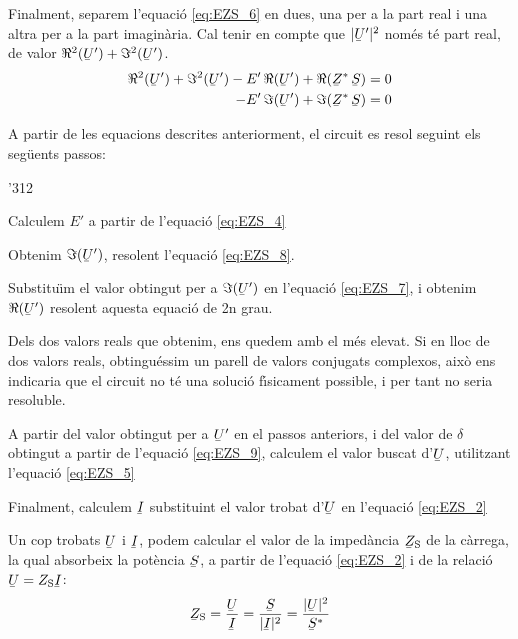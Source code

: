 Finalment, separem l'equaci\'{o} \eqref{eq:EZS_6} en dues, una per a la part real i una altra per a la part imagin\`{a}ria. Cal tenir en compte que $|\cmplx{U}'|^2$ nom\'{e}s t\'{e} part real, de valor $\Re^2(\cmplx{U}') + \Im^2(\cmplx{U}')$.
\begin{align}
   \Re^2(\cmplx{U}') + \Im^2(\cmplx{U}') - E' \, \Re(\cmplx{U}') + \Re(\cmplx{Z}^* \, \cmplx{S}) &= 0 \label{eq:EZS_7} \\
   - E' \, \Im(\cmplx{U}') + \Im(\cmplx{Z}^* \, \cmplx{S}) &= 0 \label{eq:EZS_8}
\end{align}

A partir de les equacions descrites anteriorment, el circuit es resol seguint els seg\"{u}ents passos:
\begin{dingautolist}{'312}
   \item Calculem $E'$ a partir de l'equaci\'{o} \eqref{eq:EZS_4}
   \item Obtenim $\Im(\cmplx{U}')$, resolent l'equaci\'{o} \eqref{eq:EZS_8}.
   \item Substitu\"{\i}m el valor obtingut per a $\Im(\cmplx{U}')$ en l'equaci\'{o} \eqref{eq:EZS_7}, i obtenim $\Re(\cmplx{U}')$ resolent aquesta equaci\'{o} de 2n grau.
   \item Dels dos valors reals que obtenim, ens quedem amb el m\'{e}s elevat. Si en lloc de dos valors reals, obtingu\'{e}ssim un parell de valors conjugats complexos, aix\`{o} ens indicaria que el circuit no t\'{e} una soluci\'{o} f\'{\i}sicament possible, i per tant no seria resoluble.
   \item A partir del valor  obtingut per a $\cmplx{U}'$ en el passos anteriors, i del valor de $\delta$ obtingut a partir de l'equaci\'{o} \eqref{eq:EZS_9}, calculem el valor buscat d'$\cmplx{U}$, utilitzant l'equaci\'{o} \eqref{eq:EZS_5}
   \item Finalment, calculem $\cmplx{I}$ substituint el valor trobat d'$\cmplx{U}$ en l'equaci\'{o} \eqref{eq:EZS_2}
\end{dingautolist}

Un cop trobats $\cmplx{U}$ i $\cmplx{I}$, podem calcular el valor de
la imped\`{a}ncia  $\cmplx{Z}\ped{S}$ de la c\`{a}rrega, la qual absorbeix
la pot\`{e}ncia $\cmplx{S}$, a partir de l'equaci\'{o} \eqref{eq:EZS_2} i de
la relaci\'{o} $\cmplx{U} = Z\ped{S} \cmplx{I}$:
\begin{equation}
   \cmplx{Z}\ped{S} = \frac{\cmplx{U}}{\cmplx{I}} =
   \frac{\cmplx{S}}{|\cmplx{I}|^2} =
   \frac{|\cmplx{U}|^2}{\cmplx{S}^*} \label{eq:EZS 10}
\end{equation}

